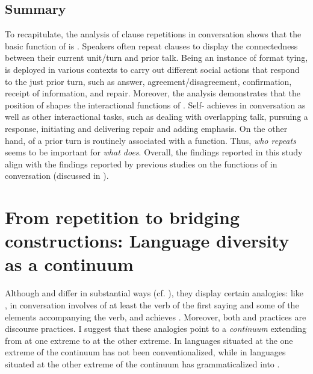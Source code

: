 \documentclass[output=paper]{LSP/langsci}
\begin{document}
\subsection{Summary}
\label{AlSummary}
To recapitulate, the analysis of clause repetitions in  conversation shows that the basic function of  is . Speakers often repeat clauses to display the connectedness between their current unit/turn and prior talk. Being an instance of format tying,  is deployed in various  contexts to carry out different social actions that respond to the just prior turn, such as answer, agreement/disagreement, confirmation, receipt of information, and repair. Moreover, the analysis demonstrates that the  position of  shapes the interactional functions of . Self- achieves  in conversation as well as other interactional tasks, such as dealing with overlapping talk, pursuing a response, initiating and delivering repair and adding emphasis. On the other hand,  of a prior turn is routinely associated with a  function. Thus, \textit{who repeats} seems to be important for \textit{what  does}. Overall, the findings reported in this study align with the findings reported by previous studies on the functions of  in conversation (discussed in ).

\section{From repetition to bridging constructions: Language diversity as a continuum}
\label{Alcontinuum}
Although  and  differ in substantial ways (cf. ), they display certain analogies: like ,  in  conversation involves  of at least the verb of the first saying and some of the elements accompanying the verb, and achieves . Moreover, both  and  practices are discourse practices. I suggest that these analogies point to a \textit{continuum} extending from  at one extreme to  at the other extreme. In languages situated at the one extreme of the continuum  has not been conventionalized, while in languages situated at the other extreme of the continuum  has grammaticalized into . 
\end{document}
